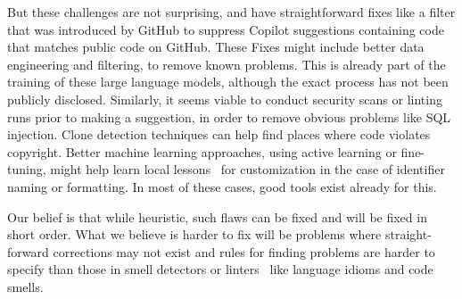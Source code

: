 But these challenges are not surprising, and have straightforward fixes like a filter that was introduced by GitHub to suppress Copilot suggestions containing code that matches public code on GitHub. These Fixes might include better data engineering and filtering, to remove known problems. This is already part of the training of these large language models, although the exact process has not been publicly disclosed.
Similarly, it seems viable to conduct security scans or linting runs prior to making a suggestion, in order to remove obvious problems like SQL injection. 
Clone detection techniques can help find places where code violates copyright. 
Better machine learning approaches, using active learning or fine-tuning, might help learn local lessons~\cite{Menzies2013} for customization in the case of identifier naming or formatting.
In most of these cases, good tools exist already for this. 

Our belief is that while heuristic, such flaws can be fixed and will be fixed in short order. 
What we believe is harder to fix will be problems where straight-forward corrections may not exist and rules for finding problems are harder to specify than those in smell detectors or linters~\cite{Ernst2017} like language idioms and code smells.
